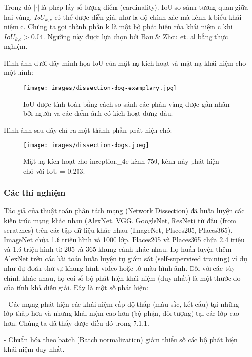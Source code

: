 Trong đó $|\cdot|$ là phép lấy số lượng điểm (cardinality). IoU so sánh tương quan giữa hai vùng. $IoU_{k,c}$ có thể được diễn giải như là độ chính xác mà kênh k biểu khái niệm c. Chúng ta gọi thành phần k là một bộ phát hiện của khái niệm c khi $IoU_{k,c}>0.04$. Ngưỡng này được lựa chọn bởi Bau $\&$ Zhou et. al bằng thực nghiệm.

Hình ảnh dưới đây minh họa IoU của mặt nạ kích hoạt và mặt nạ khái niệm cho một hình:

\begin{figure*}[h!]
	\centering
	\texttt{[image: images/dissection-dog-exemplary.jpg]}
	\label{fig:7_7}
	\caption{IoU được tính toán bằng cách so sánh các phân vùng được gắn nhãn bởi người và các điểm ảnh có kích hoạt đứng đầu.}
\end{figure*}

Hình ảnh sau đây chỉ ra một thành phần phát hiện chó:

\begin{figure*}[h!]
	\centering
	\texttt{[image: images/dissection-dogs.jpeg]}
	\label{fig:7_8}
	\caption{Mặt nạ kích hoạt cho inception\_4e kênh 750, kênh này phát hiện chó với IoU = 0.203.}
\end{figure*}

\subsubsection{Các thí nghiệm}

Tác giả của thuật toán phân tách mạng (Network Dissection) đã huấn luyện các kiến trúc mạng khác nhau (AlexNet, VGG, GoogleNet, ResNet) từ đầu (from scratches) trên các tập dữ liệu khác nhau (ImageNet, Places205, Places365). ImageNet chứa 1.6 triệu hình và 1000 lớp. Places205 và Places365 chứa 2.4 triệu và 1.6 triệu hình từ 205 và 365 khung cảnh khác nhau. Họ huấn luyện thêm AlexNet trên các bài toán huấn luyện tự giám sát (self-supervised training) ví dụ như dự đoán thứ tự khung hình video hoặc tô màu hình ảnh. Đối với các tùy chỉnh khác nhau, họ coi số bộ phát hiện khái niệm (duy nhất) là một thước đo của tính khả diễn giải. Đây là một số phát hiện:

- Các mạng phát hiện các khái niệm cấp độ thấp (màu sắc, kết cấu) tại những lớp thấp hơn và những khái niệm cao hơn (bộ phận, đối tượng) tại các lớp cao hơn. Chúng ta đã thấy được điều đó trong 7.1.1.

- Chuẩn hóa theo batch (Batch normalization) giảm thiểu số các bộ phát hiện khái niệm duy nhất.

